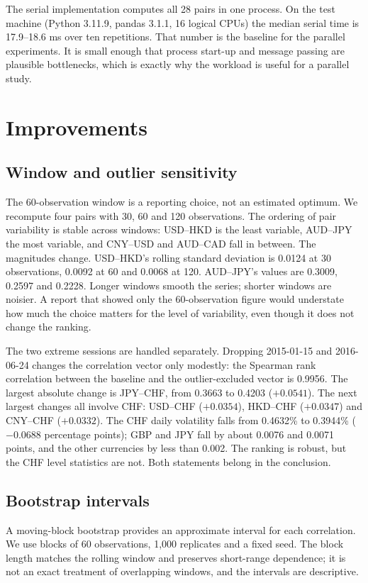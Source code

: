 \documentclass[journal]{IEEEtran}
\begin{document}
The serial implementation computes all 28 pairs in one process. On the test machine (Python 3.11.9, pandas 3.1.1, 16 logical CPUs) the median serial time is 17.9--18.6 ms over ten repetitions. That number is the baseline for the parallel experiments. It is small enough that process start-up and message passing are plausible bottlenecks, which is exactly why the workload is useful for a parallel study.

\section{Improvements}
\label{sec:improvements}

\subsection{Window and outlier sensitivity}
\label{sec:sensitivity}
The 60-observation window is a reporting choice, not an estimated optimum. We recompute four pairs with 30, 60 and 120 observations. The ordering of pair variability is stable across windows: USD--HKD is the least variable, AUD--JPY the most variable, and CNY--USD and AUD--CAD fall in between. The magnitudes change. USD--HKD's rolling standard deviation is 0.0124 at 30 observations, 0.0092 at 60 and 0.0068 at 120. AUD--JPY's values are 0.3009, 0.2597 and 0.2228. Longer windows smooth the series; shorter windows are noisier. A report that showed only the 60-observation figure would understate how much the choice matters for the level of variability, even though it does not change the ranking.

The two extreme sessions are handled separately. Dropping 2015-01-15 \cite{snb2015} and 2016-06-24 \cite{ec2016} changes the correlation vector only modestly: the Spearman rank correlation between the baseline and the outlier-excluded vector is 0.9956. The largest absolute change is JPY--CHF, from 0.3663 to 0.4203 ($+0.0541$). The next largest changes all involve CHF: USD--CHF ($+0.0354$), HKD--CHF ($+0.0347$) and CNY--CHF ($+0.0332$). The CHF daily volatility falls from 0.4632\% to 0.3944\% ($-0.0688$ percentage points); GBP and JPY fall by about 0.0076 and 0.0071 points, and the other currencies by less than 0.002. The ranking is robust, but the CHF level statistics are not. Both statements belong in the conclusion.

\subsection{Bootstrap intervals}
\label{sec:bootstrap}
A moving-block bootstrap provides an approximate interval for each correlation. We use blocks of 60 observations, 1,000 replicates and a fixed seed. The block length matches the rolling window and preserves short-range dependence; it is not an exact treatment of overlapping windows, and the intervals are descriptive.
\end{document}
